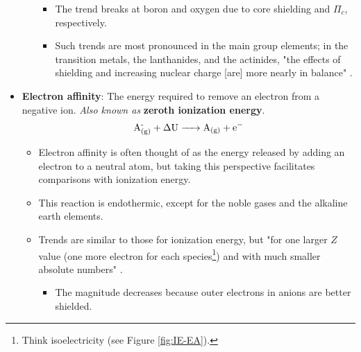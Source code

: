 \documentclass[../notes.tex]{subfiles}
\begin{document}
\begin{itemize}
\begin{itemize}
\begin{itemize}
            \item The trend breaks at boron and oxygen due to core shielding and $\Pi_c$, respectively.
            \item Such trends are most pronounced in the main group elements; in the transition metals, the lanthanides, and the actinides, "the effects of shielding and increasing nuclear charge [are] more nearly in balance" \parencite[37]{bib:MiesslerFischerTarr}.
        \end{itemize}
    \end{itemize}
    \item \textbf{Electron affinity}: The energy required to remove an electron from a negative ion. \emph{Also known as} \textbf{zeroth ionization energy}.
    \begin{equation*}
        \ce{{A^-_{(g)}} + \Delta U -> A_{(g)} + e-}
    \end{equation*}
    \begin{itemize}
        \item Electron affinity is often thought of as the energy released by adding an electron to a neutral atom, but taking this perspective facilitates comparisons with ionization energy.
        \item This reaction is endothermic, except for the noble gases and the alkaline earth elements.
        \item Trends are similar to those for ionization energy, but "for one larger $Z$ value (one more electron for each species\footnote{Think isoelectricity (see Figure \ref{fig:IE-EA}).}) and with much smaller absolute numbers" \parencite[37]{bib:MiesslerFischerTarr}.
        \begin{itemize}
            \item The magnitude decreases because outer electrons in anions are better shielded.
        \end{itemize}
    \end{itemize}
    \pagebreak
    \begin{figure}[h!]
        \centering
\end{figure}
\end{itemize}
\end{document}

